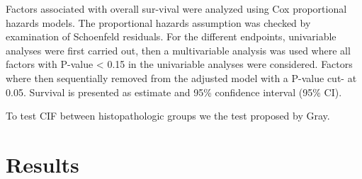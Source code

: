 \documentclass[a4paper,11pt] {article}
\begin{document}
Factors associated with overall sur-vival were analyzed using Cox proportional hazards models. The proportional hazards assumption was checked by examination of Schoenfeld residuals.
For the different endpoints, univariable analyses were first carried out, then a multivariable analysis was used where all factors with P-value < 0.15 in the univariable analyses were considered. Factors where then sequentially removed from the adjusted model with a P-value cut- at 0.05. 
Survival is presented as estimate and 95\% confidence interval (95\% CI).


To test CIF between histopathologic groups we the test proposed by Gray. 

\pagebreak[4]
\section{Results}
\end{document}
